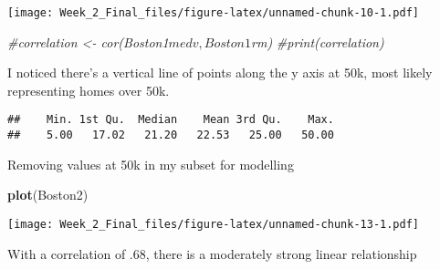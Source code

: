 \documentclass[]{article}
\newenvironment{Shaded}{\begin{snugshade}}{\end{snugshade}}
\newcommand{\KeywordTok}[1]{\textcolor[rgb]{0.13,0.29,0.53}{\textbf{#1}}}
\newcommand{\DataTypeTok}[1]{\textcolor[rgb]{0.13,0.29,0.53}{#1}}
\newcommand{\DecValTok}[1]{\textcolor[rgb]{0.00,0.00,0.81}{#1}}
\newcommand{\StringTok}[1]{\textcolor[rgb]{0.31,0.60,0.02}{#1}}
\newcommand{\CommentTok}[1]{\textcolor[rgb]{0.56,0.35,0.01}{\textit{#1}}}
\newcommand{\OperatorTok}[1]{\textcolor[rgb]{0.81,0.36,0.00}{\textbf{#1}}}
\newcommand{\NormalTok}[1]{#1}
\begin{document}
\texttt{[image: Week\_2\_Final\_files/figure-latex/unnamed-chunk-10-1.pdf]}

\begin{Shaded}
\begin{Highlighting}[]
\CommentTok{#correlation <- cor(Boston1$medv,Boston1$rm)}
\CommentTok{#print(correlation)}
\end{Highlighting}
\end{Shaded}

I noticed there's a vertical line of points along the y axis at 50k,
most likely representing homes over 50k.

\begin{Shaded}
\end{Shaded}

\begin{verbatim}
##    Min. 1st Qu.  Median    Mean 3rd Qu.    Max. 
##    5.00   17.02   21.20   22.53   25.00   50.00
\end{verbatim}

Removing values at 50k in my subset for modelling

\begin{Shaded}
\end{Shaded}

\begin{Shaded}
\begin{Highlighting}[]
\KeywordTok{plot}\NormalTok{(Boston2)}
\end{Highlighting}
\end{Shaded}

\texttt{[image: Week\_2\_Final\_files/figure-latex/unnamed-chunk-13-1.pdf]}

With a correlation of .68, there is a moderately strong linear
relationship

\begin{Shaded}
\end{Shaded}
\end{document}
